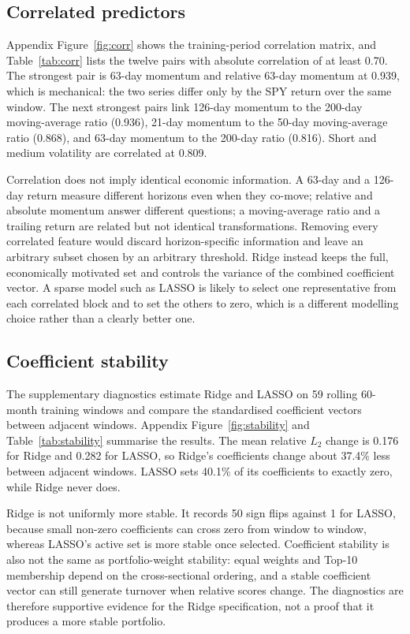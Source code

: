 \documentclass[11pt,a4paper]{article}
\begin{document}
\subsection{Correlated predictors}

Appendix Figure~\ref{fig:corr} shows the training-period correlation matrix, and Table~\ref{tab:corr} lists the twelve pairs with absolute correlation of at least 0.70. The strongest pair is 63-day momentum and relative 63-day momentum at 0.939, which is mechanical: the two series differ only by the SPY return over the same window. The next strongest pairs link 126-day momentum to the 200-day moving-average ratio (0.936), 21-day momentum to the 50-day moving-average ratio (0.868), and 63-day momentum to the 200-day ratio (0.816). Short and medium volatility are correlated at 0.809.

Correlation does not imply identical economic information. A 63-day and a 126-day return measure different horizons even when they co-move; relative and absolute momentum answer different questions; a moving-average ratio and a trailing return are related but not identical transformations. Removing every correlated feature would discard horizon-specific information and leave an arbitrary subset chosen by an arbitrary threshold. Ridge instead keeps the full, economically motivated set and controls the variance of the combined coefficient vector. A sparse model such as LASSO is likely to select one representative from each correlated block and to set the others to zero, which is a different modelling choice rather than a clearly better one.



\subsection{Coefficient stability}

The supplementary diagnostics estimate Ridge and LASSO on 59 rolling 60-month training windows and compare the standardised coefficient vectors between adjacent windows. Appendix Figure~\ref{fig:stability} and Table~\ref{tab:stability} summarise the results. The mean relative $L_2$ change is 0.176 for Ridge and 0.282 for LASSO, so Ridge's coefficients change about 37.4\% less between adjacent windows. LASSO sets 40.1\% of its coefficients to exactly zero, while Ridge never does.

Ridge is not uniformly more stable. It records 50 sign flips against 1 for LASSO, because small non-zero coefficients can cross zero from window to window, whereas LASSO's active set is more stable once selected. Coefficient stability is also not the same as portfolio-weight stability: equal weights and Top-10 membership depend on the cross-sectional ordering, and a stable coefficient vector can still generate turnover when relative scores change. The diagnostics are therefore supportive evidence for the Ridge specification, not a proof that it produces a more stable portfolio.
\end{document}

